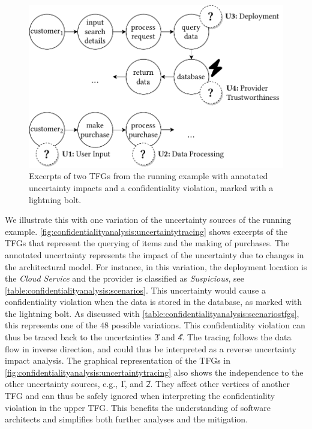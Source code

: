 \begin{figure}
    \centering
    \includegraphics[width=0.95\linewidth]{figures/chapter7/uncertaintytracing.pdf}
    \caption{Excerpts of two \acfp*{TFG} from the running example with annotated uncertainty impacts and a confidentiality violation, marked with a lightning bolt.}
    \label{fig:confidentialityanalysis:uncertaintytracing}
\end{figure}

We illustrate this with one variation of the uncertainty sources of the running example.
\autoref{fig:confidentialityanalysis:uncertaintytracing} shows excerpts of the \acp{TFG} that represent the querying of items and the making of purchases.
The annotated uncertainty represents the impact of the uncertainty due to changes in the architectural model.
For instance, in this variation, the deployment location is the \emph{Cloud Service} and the provider is classified as \emph{Suspicious}, see \autoref{table:confidentialityanalysis:scenarios}.
This uncertainty would cause a confidentiality violation when the data is stored in the database, as marked with the lightning bolt.
As discussed with \autoref{table:confidentialityanalysis:scenariostfgs}, this represents one of the $48$ possible variations.
This confidentiality violation can thus be traced back to the uncertainties \U{3} and \U{4}.
The tracing follows the data flow in inverse direction, and could thus be interpreted as a reverse uncertainty impact analysis.
The graphical representation of the \acp{TFG} in \autoref{fig:confidentialityanalysis:uncertaintytracing} also shows the independence to the other uncertainty sources, e.g., \U{1}, and \U{2}.
They affect other vertices of another \ac{TFG} and can thus be safely ignored when interpreting the confidentiality violation in the upper \ac{TFG}.
This benefits the understanding of software architects and simplifies both further analyses and the mitigation.

